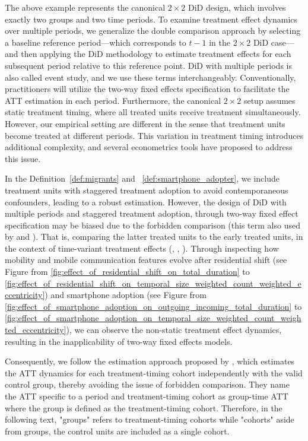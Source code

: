 The above example represents the canonical \( 2 \times 2 \) DiD design, which involves exactly two groups and two time periods.
To examine treatment effect dynamics over multiple periods, we generalize the double comparison approach by selecting a baseline reference period---which corresponds to \( t-1 \) in the $2 \times 2$ DiD case---and then applying the DiD methodology to estimate treatment effects for each subsequent period relative to this reference point.
DiD with multiple periods is also called event study, and we use these terms interchangeably.
Conventionally, practitioners will utilize the two-way fixed effects specification to facilitate the ATT estimation in each period. Furthermore, the canonical \( 2 \times 2 \) setup assumes static treatment timing, where all treated units receive treatment simultaneously. However, our empirical setting are different in the sense that treatment units become treated at different periods. This variation in treatment timing introduces additional complexity, and several econometrics tools have proposed to address this issue.


In the Definition~\ref{def:migrants} and ~\ref{def:smartphone_adopter}, we include treatment units with staggered treatment adoption to avoid contemporaneous confounders, leading to a robust estimation.
However, the design of DiD with multiple periods and staggered treatment adoption, through two-way fixed effect specification may be biased due to the forbidden comparison (this term also used by \cite{roth2023s} and \cite{de2023two}). That is, comparing the latter treated units to the early treated units, in the context of time-variant treatment effects (\cite{goodman2021difference}, \cite{sun2021estimating}, \cite{baker2022much}).
Through inspecting how mobility and mobile communication features evolve after residential shift (see Figure from \ref{fig:effect_of_residential_shift_on_total_duration} to \ref{fig:effect_of_residential_shift_on_temporal_size_weighted_count_weighted_eccentricity}) and smartphone adoption (see Figure from \ref{fig:effect_of_smartphone_adoption_on_outgoing_incoming_total_duration} to \ref{fig:effect_of_smartphone_adoption_on_temporal_size_weighted_count_weighted_eccentricity}), we can observe the non-static treatment effect dynamics, resulting in the inapplicability of two-way fixed effects models.

Consequently, we follow the estimation approach proposed by \cite{callaway2021difference}, which estimates the ATT dynamics for each treatment-timing cohort independently with the valid control group, thereby avoiding the issue of forbidden comparison.
They name the ATT specific to a period and treatment-timing cohort as group-time ATT where the group is defined as the treatment-timing cohort.
Therefore, in the following text, "groups" refers to treatment-timing cohorts while "cohorts" aside from groups, the control units are included as a single cohort.

